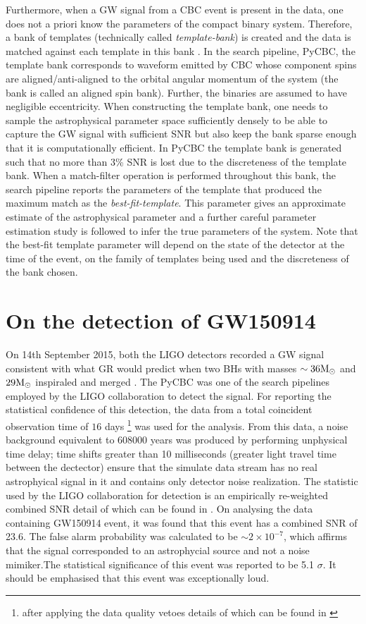 Furthermore, when a GW signal from a CBC event is present in the data, one does not a priori know the parameters of the compact binary system. Therefore, a bank of templates (technically called \textit{template-bank}) is created and the data is matched against each template in this bank \cite{FindChirp}. In the search pipeline, PyCBC, the template bank corresponds to waveform emitted by CBC whose component spins are aligned/anti-aligned to the orbital angular momentum of the system (the bank is called an aligned spin bank). Further, the binaries are assumed to have negligible eccentricity. When constructing the template bank, one needs to sample the astrophysical parameter space sufficiently densely to be able to capture the GW signal with sufficient SNR but also keep the bank sparse enough that it is computationally efficient. In PyCBC the template bank is generated such that no more than 3\% SNR is lost due to the discreteness of the template bank. When a match-filter operation is performed throughout this bank, the search pipeline reports the parameters of the template that produced the maximum match as the \textit{best-fit-template}. This parameter gives an approximate estimate of the astrophysical parameter and a further careful parameter estimation study is followed to infer the true parameters of the system. Note that the best-fit template parameter will depend on the state of the detector at the time of the event, on the family of templates being used and the discreteness of the bank chosen. 

\section{On the detection of GW150914}

On 14th September 2015, both the LIGO detectors recorded a GW signal consistent with what GR would predict when two BHs with masses $\sim 36\mathrm{M}_\odot$ and $29\mathrm{M}_\odot$ inspiraled and merged \cite{gw150914detection,gw150914search}. The PyCBC was one of the search pipelines employed by the LIGO collaboration to detect the signal. For reporting the statistical confidence of this detection, the data from a total coincident observation time of $16$ days \footnote{after applying the data quality vetoes details of which can be found in \cite{gw150914vetos}}  was used for the analysis. From this data, a noise background equivalent to 608000 years was produced by performing unphysical time delay; time shifts greater than 10 milliseconds (greater light travel time between the dectector) ensure that the simulate data stream has no real astrophyical signal in it and contains only detector noise realization. The statistic used by the LIGO collaboration for detection is an empirically re-weighted combined SNR detail of which can be found in \cite{detectionStat1}. On analysing the data containing GW150914 event, it was found that this event has a combined SNR of 23.6. The false alarm probability was calculated to be $\sim 2 \times 10^{ -7}$, which affirms that the signal corresponded to an astrophycial source and not a noise mimiker.The statistical significance of this event was reported to be 5.1 $\sigma$. It should be emphasised that this event was exceptionally loud. 


